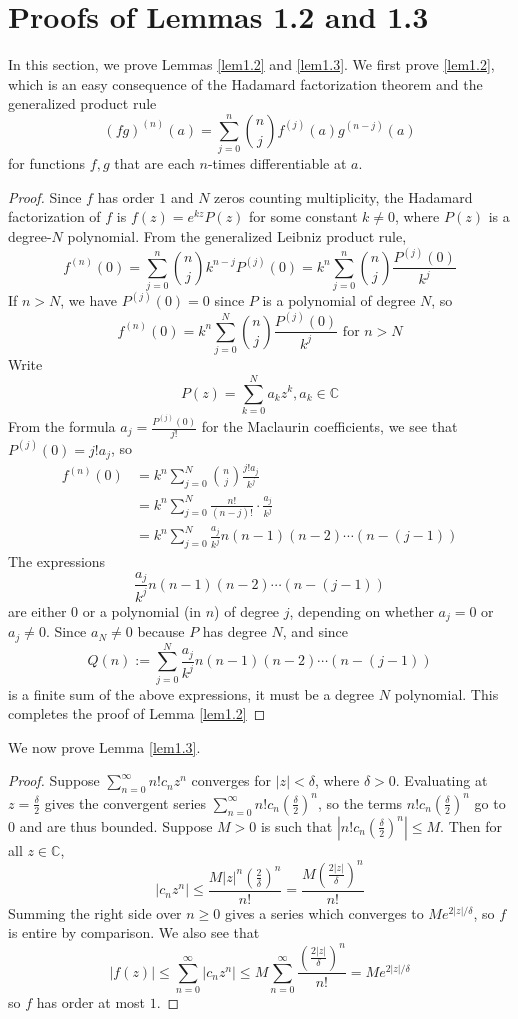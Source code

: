 \documentclass[12pt,a4paper,reqno]{amsart}
\numberwithin{equation}{section}
\theoremstyle{plain}
\theoremstyle{definition}
\newcommand\C{\mathbb{C}}
\begin{document}
    \section{Proofs of Lemmas 1.2 and 1.3}
    In this section, we prove Lemmas \ref{lem1.2} and \ref{lem1.3}. We first prove \ref{lem1.2}, which is an easy consequence of the Hadamard factorization theorem and the generalized product rule
    $$(fg)^{(n)}(a)=\sum_{j=0}^n {\binom n j}f^{(j)}(a)g^{(n-j)}(a)$$
    for functions $f,g$ that are each $n$-times differentiable at $a$.
    \begin{proof}
        Since $f$ has order $1$ and $N$ zeros counting multiplicity, the Hadamard factorization of $f$ is $f(z)=e^{kz}P(z)$ for some constant $k\neq 0$, where $P(z)$ is a degree-$N$ polynomial. From the generalized Leibniz product rule,
        $$f^{(n)}(0)=\sum_{j=0}^n {\binom n j}k^{n-j}P^{(j)}(0)=k^n\sum_{j=0}^n {\binom n j}\frac{P^{(j)}(0)}{k^j}$$
        If $n>N$, we have $P^{(j)}(0)=0$ since $P$ is a polynomial of degree $N$, so
        $$f^{(n)}(0)=k^n\sum_{j=0}^N {\binom n j}\frac{P^{(j)}(0)}{k^j}\text{ for $n>N$}$$
        Write
        $$P(z)=\sum_{k=0}^N a_k z^k, a_k\in\C$$
        From the formula $a_j=\frac{P^{(j)}(0)}{j!}$ for the Maclaurin coefficients, we see that $P^{(j)}(0)=j!a_j$, so
        \begin{align*}
            f^{(n)}(0) &= k^n\sum_{j=0}^N {\binom n j}\frac{j!a_j}{k^j}\\
            &= k^n\sum_{j=0}^N \frac{n!}{(n-j)!}\cdot\frac{a_j}{k^j}\\
            &= k^n\sum_{j=0}^N \frac{a_j}{k^j}n(n-1)(n-2)\cdots(n-(j-1))
        \end{align*}
        The expressions
        $$\frac{a_j}{k^j}n(n-1)(n-2)\cdots(n-(j-1))$$
        are either $0$ or a polynomial (in $n$) of degree $j$, depending on whether $a_j=0$ or $a_j\neq 0$. Since $a_N\neq 0$ because $P$ has degree $N$, and since
        $$Q(n):=\sum_{j=0}^N \frac{a_j}{k^j}n(n-1)(n-2)\cdots(n-(j-1))$$
        is a finite sum of the above expressions, it must be a degree $N$ polynomial. This completes the proof of Lemma \ref{lem1.2}
    \end{proof}
    We now prove Lemma \ref{lem1.3}.
    \begin{proof}
        Suppose $\sum_{n=0}^\infty n!c_n z^n$ converges for $|z|<\delta$, where $\delta>0$. Evaluating at $z=\frac{\delta}{2}$ gives the convergent series $\sum_{n=0}^\infty n!c_n \left(\frac{\delta}{2}\right)^n$, so the terms $n!c_n \left(\frac{\delta}{2}\right)^n$ go to $0$ and are thus bounded. Suppose $M>0$ is such that $\left|n!c_n \left(\frac{\delta}{2}\right)^n\right|\leq M$. Then for all $z\in\C$,
        $$|c_nz^n|\leq \frac{M|z|^n\left(\frac{2}{\delta}\right)^n}{n!}=\frac{M\left(\frac{2|z|}{\delta}\right)^n}{n!}$$
        Summing the right side over $n\geq 0$ gives a series which converges to $Me^{2|z|/\delta}$, so $f$ is entire by comparison. We also see that
        \begin{equation}\label{ineq1.1}
            |f(z)|\leq \sum_{n=0}^\infty |c_n z^n|\leq M\sum_{n=0}^\infty\frac{\left(\frac{2|z|}{\delta}\right)^n}{n!}=Me^{2|z|/\delta}
        \end{equation}
        so $f$ has order at most $1$.
    \end{proof}
\end{document}
